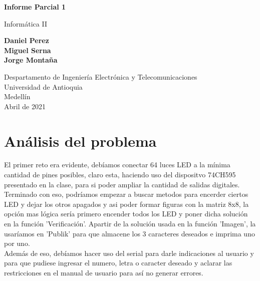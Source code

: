 \documentclass{article}
\begin{document}
\begin{titlepage}
    \begin{center}
        \vspace*{1cm}
            
        \Huge
        \textbf{Informe Parcial 1}
            
        \vspace{0.5cm}
        \LARGE
        Informática II
            
        \vspace{1.5cm}
            
        \textbf{Daniel Perez\\Miguel Serna\\Jorge Montaña}
            
        \vfill
            
        \vspace{0.8cm}
            
        \Large
        Despartamento de Ingeniería Electrónica y Telecomunicaciones\\
        Universidad de Antioquia\\
        Medellín\\
        Abril de 2021
            
    \end{center}
\end{titlepage}

\tableofcontents

\section{Análisis del problema}
El primer reto era evidente, debíamos conectar 64 luces LED a la mínima cantidad de pines posibles, claro esta, haciendo uso del dispositvo 74CH595 presentado en la clase, para si poder ampliar la cantidad de salidas digitales.\\

Terminado con eso, podríamos empezar a buscar metodos para encerder ciertos LED y dejar los otros apagados y asi poder formar figuras con la matriz 8x8, la opción mas lógica sería primero encender todos los LED y poner dicha solución en la función 'Verificación'. Apartir de la solución usada en la función 'Imagen', la usaríamos en 'Publik' para que almacene los 3 caracteres deseados e imprima uno por uno.\\

Además de eso, debíamos hacer uso del serial para darle indicaciones al usuario y para que pudiese ingresar el numero, letra o caracter deseado y  aclarar las restricciones en el manual de usuario para así no generar errores.
\end{document}
